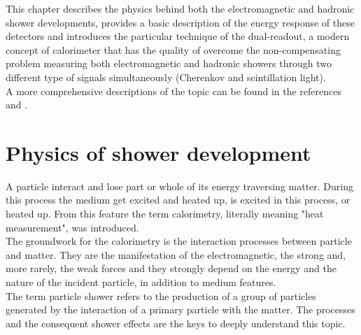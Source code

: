 
This chapter describes the physics behind both the electromagnetic and hadronic shower developments, provides a basic description of the energy response of these detectors and introduces the particular technique of the dual-readout, a modern concept of calorimeter that has the quality of overcome the non-compensating problem measuring both electromagnetic and hadronic showers through two different type of signals simultaneously (Cherenkov and scintillation light).\\

A more comprehensive descriptions of the topic can be found in the references \cite{Wigmans_book} and \cite{Gianotti_article}.

\section{Physics of shower development}
A particle interact and lose part or whole of its energy traversing matter. During this process the medium get excited and heated up, is excited in this process, or heated up. From this feature the term calorimetry, literally meaning "heat measurement", was introduced.\\
The groundwork for the calorimetry is the interaction processes between particle and matter. They are the manifestation of the electromagnetic, the strong and, more rarely, the weak forces and they strongly depend on the energy and the nature of the incident particle, in addition to medium features.\\
The term particle shower refers to the production of a group of particles generated by the interaction of a primary particle with the matter. The processes and the consequent shower effects are the keys to deeply understand this topic.\\

